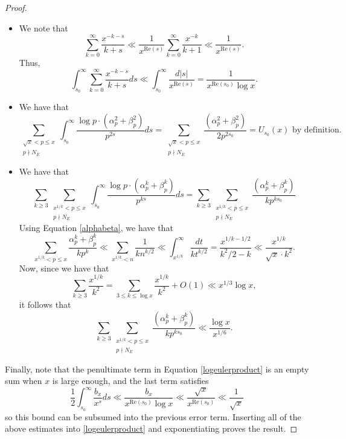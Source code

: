 \documentclass[10pt,a4paper]{amsart}
\renewcommand{\Re}{\mathrm{Re}}
\begin{document}
\begin{proof}
\begin{itemize}
\item We note that 
\begin{equation*}
\sum_{k=0}^{\infty} \frac{x^{-k-s}}{k+s}
\ll \frac{1}{x^{\Re(s)}} \sum_{k=0}^{\infty}  \frac{x^{-k}}{k+1} \ll \frac{1}{x^{\Re(s)}}. 
\end{equation*}
Thus, 
\begin{equation*}
\int_{s_0}^{\infty} \sum_{k=0}^{\infty} \frac{x^{-k-s}}{k+s} ds \ll \int_{s_0}^{\infty} \frac{d|s|}{x^{\Re(s)} }= \frac{1}{x^{\Re(s_0)} \log x}. 
\end{equation*}

\item We have that 
\begin{equation*}
\sum_{\substack{\sqrt x < p \leq x \\ p \nmid  N_E}} \int_{s_0}^{\infty} \frac{\log p \cdot (\alpha_p^2+\beta_p^2)}{p^{2s}}ds = \sum_{\substack{\sqrt x < p \leq x \\ p \nmid  N_E}} \frac{(\alpha_p^2+\beta_p^2) }{2p^{2s_0}}=U_{s_0}(x) \textrm{ by definition. }
\end{equation*}


\item  We have that 
$$
 \sum_{k \geq 3} \sum_{\substack{x^{1/k} < p \leq x \\ p \nmid  N_E}} \int_{s_0}^{\infty} \frac{\log p \cdot (\alpha_p^k+\beta_p^k)}{p^{ks}}ds =  \sum_{k \geq 3} \sum_{\substack{x^{1/k} < p \leq x \\ p \nmid  N_E}} \frac{(\alpha_p^k+\beta_p^k) }{kp^{ks_0}} 
$$
Using Equation \eqref{alphabeta}, we have that 
\begin{equation*}
\sum_{x^{1/k}<p \leq x} \frac{\alpha_p^k+\beta_p^k}{k p^k} \ll \sum_{x^{1/k}<n} \frac{1}{k n^{k/2} } \ll \int_{x^{1/k} }^{\infty} \frac{dt}{k t^{k/2} }= \frac{x^{{1/k}-1/2}}{k^2/2-k} \ll \frac{x^{1/k}}{\sqrt x \cdot k^2}. 
\end{equation*}
Now, since we have that
\begin{equation*}
\sum_{k \geq 3} \frac{x^{1/k} }{k^2} = \sum_{3 \leq k \leq \log x} \frac{x^{1/k} }{k^2} +O(1) \ll x^{1/3} \log x, 
\end{equation*}
it follows that 
$$
\sum_{k \geq 3} \sum_{\substack{ x^{1/k} < p \leq x \\ p \nmid  N_E}} \frac{(\alpha_p^k+\beta_p^k) }{kp^{ks_0}} \ll \frac{\log x}{x^{1/6}}. 
$$
\end{itemize}

Finally, note that the penultimate term in Equation \eqref{logeulerproduct} is an empty sum when $x$ is large enough, and the last term satisfies 
$$
\frac{1}{2} \int_{s_0}^{\infty} \frac{b_x}{x^s} ds \ll \frac{b_x}{x^{ \Re(s_0)} \log x} \ll  \frac{\sqrt x}{x^{ \Re(s_0) }} \ll \frac{1}{\sqrt x}
$$
so this bound can be subsumed into the previous error term. Inserting all of the above estimates into \eqref{logeulerproduct} and exponentiating proves the result. 
\end{proof}
\end{document}
